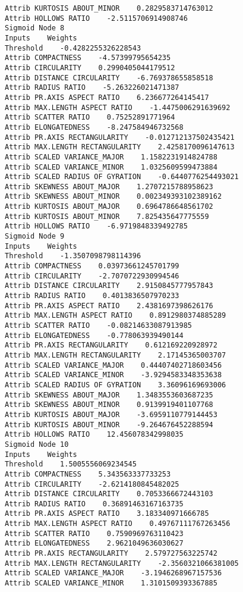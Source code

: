 \documentclass[
	article,			%
	11pt,				%
	oneside,			%
	a4paper,			%
	english,			%
	brazil,				%
	sumario=tradicional
	]{abntex2}
\begin{document}
\begin{lstlisting}
Attrib KURTOSIS ABOUT_MINOR    0.2829583714763012
Attrib HOLLOWS RATIO    -2.5115706914908746
Sigmoid Node 8
Inputs    Weights
Threshold    -0.4282255326228543
Attrib COMPACTNESS    -4.57399795654235
Attrib CIRCULARITY    0.2990405044179512
Attrib DISTANCE CIRCULARITY    -6.769378655858518
Attrib RADIUS RATIO    -5.263226021471387
Attrib PR.AXIS ASPECT RATIO    6.236677264145417
Attrib MAX.LENGTH ASPECT RATIO    -1.4475006291639692
Attrib SCATTER RATIO    0.75252891771964
Attrib ELONGATEDNESS    -8.247584946732568
Attrib PR.AXIS RECTANGULARITY    -0.012712137502435421
Attrib MAX.LENGTH RECTANGULARITY    2.4258170096147613
Attrib SCALED VARIANCE_MAJOR    1.1582231914824788
Attrib SCALED VARIANCE_MINOR    1.0325609599473884
Attrib SCALED RADIUS OF GYRATION    -0.6440776254493021
Attrib SKEWNESS ABOUT_MAJOR    1.2707215788958623
Attrib SKEWNESS ABOUT_MINOR    0.002349393102389162
Attrib KURTOSIS ABOUT_MAJOR    0.6964786648561702
Attrib KURTOSIS ABOUT_MINOR    7.825435647775559
Attrib HOLLOWS RATIO    -6.9719848339492785
Sigmoid Node 9
Inputs    Weights
Threshold    -1.3507098798114396
Attrib COMPACTNESS    0.03973661245701799
Attrib CIRCULARITY    -2.7070722930994546
Attrib DISTANCE CIRCULARITY    2.9150845777957843
Attrib RADIUS RATIO    0.4013836507970233
Attrib PR.AXIS ASPECT RATIO    2.4381697398626176
Attrib MAX.LENGTH ASPECT RATIO    0.8912980374885289
Attrib SCATTER RATIO    -0.08214633087913985
Attrib ELONGATEDNESS    -0.778063939490144
Attrib PR.AXIS RECTANGULARITY    0.612169220928972
Attrib MAX.LENGTH RECTANGULARITY    2.17145365003707
Attrib SCALED VARIANCE_MAJOR    0.44407402718603456
Attrib SCALED VARIANCE_MINOR    -3.9294583348353638
Attrib SCALED RADIUS OF GYRATION    3.36096169693006
Attrib SKEWNESS ABOUT_MAJOR    1.3483553603687235
Attrib SKEWNESS ABOUT_MINOR    0.9139919401107768
Attrib KURTOSIS ABOUT_MAJOR    -3.6959110779144453
Attrib KURTOSIS ABOUT_MINOR    -9.264676452288594
Attrib HOLLOWS RATIO    12.456078342998035
Sigmoid Node 10
Inputs    Weights
Threshold    1.5005556069234545
Attrib COMPACTNESS    5.343563337733253
Attrib CIRCULARITY    -2.6214180845482025
Attrib DISTANCE CIRCULARITY    0.7053366672443103
Attrib RADIUS RATIO    0.36891463167163735
Attrib PR.AXIS ASPECT RATIO    3.183340971666785
Attrib MAX.LENGTH ASPECT RATIO    0.49767111767263456
Attrib SCATTER RATIO    0.7590969763110423
Attrib ELONGATEDNESS    2.9621049636030627
Attrib PR.AXIS RECTANGULARITY    2.579727563225742
Attrib MAX.LENGTH RECTANGULARITY    -2.3560321066381005
Attrib SCALED VARIANCE_MAJOR    -3.1946268967157536
Attrib SCALED VARIANCE_MINOR    1.3101509393367885

\end{lstlisting}
\end{document}

